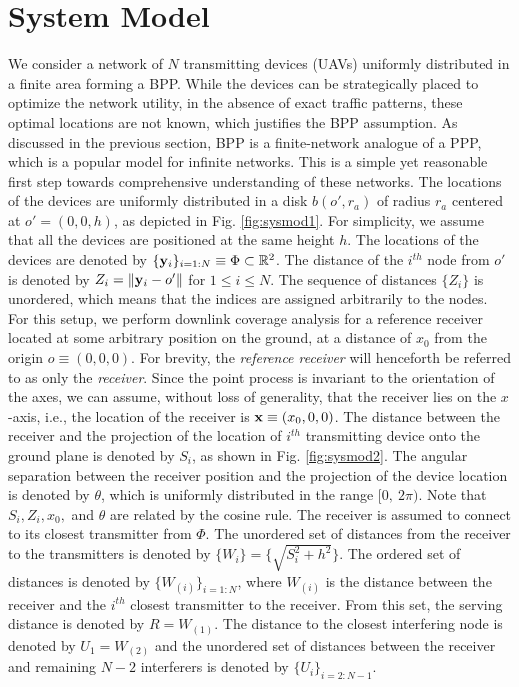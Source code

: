 \documentclass[journal,draftclsnofoot,onecolumn,12pt]{IEEEtran}
\begin{document}
\section{System Model} \label{sec:SysMod}
We consider a network of $N$ transmitting devices (UAVs) uniformly distributed in a finite area forming a BPP. While the devices can be strategically placed to optimize the network utility, in the absence of exact traffic patterns, these optimal locations are not known, which justifies the BPP assumption. As discussed in the previous section, BPP is a finite-network analogue of a PPP, which is a popular model for infinite networks. This is a simple yet reasonable first step towards comprehensive understanding of these networks. The locations of the devices are uniformly distributed in a disk $b(o',r_a)$ of radius $r_a$ centered at $o' = (0,0,h)$, as depicted in Fig. \ref{fig:sysmod1}. For simplicity, we assume that all the devices are positioned at the same height $h$. The locations of the devices are denoted by $\{{\bf{y}}_i\}_{i=1:N} \equiv \Phi \subset {\mathbb{R}}^2$. The distance of the $i^{th}$ node from $o'$ is denoted by $Z_i = \|{\bf{y}}_i - o'\|$ for $1 \leq i \leq N$. The sequence of distances $\{Z_i\}$ is unordered, which means that the indices are assigned arbitrarily to the nodes.
For this setup, we perform downlink coverage analysis for a reference receiver located at some arbitrary position on the ground, at a distance of $x_0$ from the origin $o \equiv (0,0,0)$. For brevity, the {\em reference receiver} will henceforth be referred to as only the {\em receiver}. Since the point process is invariant to the orientation of the axes, we can assume, without loss of generality, that the receiver lies on the $x$-axis, i.e., the location of the receiver is ${\bf{x}} \equiv (x_0,0,0)$. The distance between the receiver and the projection of the location of $i^{th}$ transmitting device onto the ground plane is denoted by $S_i$, as shown in Fig. \ref{fig:sysmod2}. The angular separation between the receiver position and the projection of the device location is denoted by $\theta$, which is uniformly distributed in the range $[0,\  2\pi)$. Note that $S_i, Z_i, x_0,$ and $\theta$ are related by the cosine rule. The receiver is assumed to connect to its closest transmitter from $\Phi$. The unordered set of distances from the receiver to the transmitters is denoted by $\{W_i\} = \{\sqrt{S_i^2 + h^2}\} $. The ordered set of distances is denoted by $\{W_{(i)}\}_{i=1:N}$, where $W_{(i)}$ is the distance between the receiver and the $i^{th}$ closest transmitter to the receiver. From this set, the serving distance is denoted by $R=W_{(1)}$. The distance to the closest interfering node is denoted by $U_1 = W_{(2)}$ and the unordered set of distances between the receiver and remaining $N-2$ interferers is denoted by $\{U_i\}_{i=2:N-1}$. 
\end{document}
